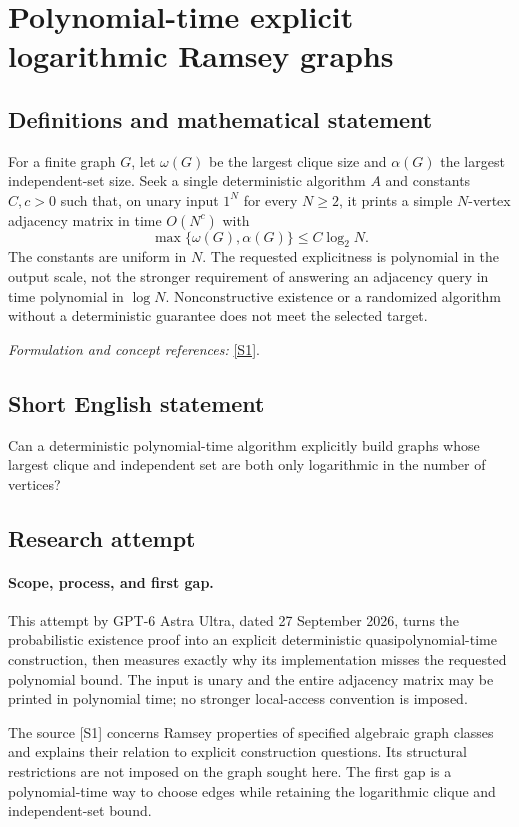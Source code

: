 \documentclass[11pt]{article}
\begin{document}
\section*{\texorpdfstring{Polynomial-time explicit logarithmic Ramsey graphs}{Polynomial-time explicit logarithmic Ramsey graphs}}\label{30006832}
\subsection{Definitions and mathematical statement}
For a finite graph $G$, let $\omega(G)$ be the largest clique size and $\alpha(G)$ the largest independent-set size. Seek a single deterministic algorithm $A$ and constants $C,c>0$ such that, on unary input $1^N$ for every $N\ge2$, it prints a simple $N$-vertex adjacency matrix in time $O(N^c)$ with
\[
 \max\{\omega(G),\alpha(G)\}\le C\log_2N.
\]
The constants are uniform in $N$. The requested explicitness is polynomial in the output scale, not the stronger requirement of answering an adjacency query in time polynomial in $\log N$. Nonconstructive existence or a randomized algorithm without a deterministic guarantee does not meet the selected target.
\par\smallskip\textit{Formulation and concept references:} \href{https://arxiv.org/pdf/2103.05618v2}{[S1]}.

\subsection{Short English statement}
Can a deterministic polynomial-time algorithm explicitly build graphs whose largest clique and independent set are both only logarithmic in the number of vertices?
\subsection{Research attempt}
\paragraph{Scope, process, and first gap.}
This attempt by GPT-6 Astra Ultra, dated 27 September 2026, turns the probabilistic existence proof into an explicit deterministic quasipolynomial-time construction, then measures exactly why its implementation misses the requested polynomial bound. The input is unary and the entire adjacency matrix may be printed in polynomial time; no stronger local-access convention is imposed.

The source [S1] concerns Ramsey properties of specified algebraic graph classes and explains their relation to explicit construction questions. Its structural restrictions are not imposed on the graph sought here. The first gap is a polynomial-time way to choose edges while retaining the logarithmic clique and independent-set bound.
\end{document}
